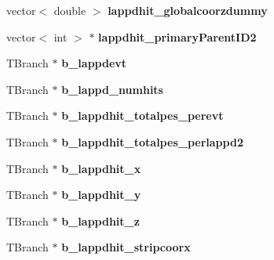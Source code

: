 \begin{DoxyCompactItemize}
\item 
\hypertarget{classLAPPDTree_a9ed8c2c3aa42ecc9fbaa575caa076940}{vector$<$ double $>$ {\bfseries lappdhit\-\_\-globalcoorzdummy}}\label{classLAPPDTree_a9ed8c2c3aa42ecc9fbaa575caa076940}

\item 
\hypertarget{classLAPPDTree_a372097f371b2bbd414b6447da2e5fd51}{vector$<$ int $>$ $\ast$ {\bfseries lappdhit\-\_\-primary\-Parent\-I\-D2}}\label{classLAPPDTree_a372097f371b2bbd414b6447da2e5fd51}

\item 
\hypertarget{classLAPPDTree_af47a619c8a87743efecb91b7fbf2c7be}{T\-Branch $\ast$ {\bfseries b\-\_\-lappdevt}}\label{classLAPPDTree_af47a619c8a87743efecb91b7fbf2c7be}

\item 
\hypertarget{classLAPPDTree_af2d3bcf8ac6d1984ddd5da708841fd81}{T\-Branch $\ast$ {\bfseries b\-\_\-lappd\-\_\-numhits}}\label{classLAPPDTree_af2d3bcf8ac6d1984ddd5da708841fd81}

\item 
\hypertarget{classLAPPDTree_aaffff4e3fa3c778499625bc2c79179de}{T\-Branch $\ast$ {\bfseries b\-\_\-lappdhit\-\_\-totalpes\-\_\-perevt}}\label{classLAPPDTree_aaffff4e3fa3c778499625bc2c79179de}

\item 
\hypertarget{classLAPPDTree_a97ffd58d9a74db4d2026aea619e55c3e}{T\-Branch $\ast$ {\bfseries b\-\_\-lappdhit\-\_\-totalpes\-\_\-perlappd2}}\label{classLAPPDTree_a97ffd58d9a74db4d2026aea619e55c3e}

\item 
\hypertarget{classLAPPDTree_aaa3ff0b6eefee590df4209064eb2907f}{T\-Branch $\ast$ {\bfseries b\-\_\-lappdhit\-\_\-x}}\label{classLAPPDTree_aaa3ff0b6eefee590df4209064eb2907f}

\item 
\hypertarget{classLAPPDTree_adc45ffd7b8f116526d1683182a8b0104}{T\-Branch $\ast$ {\bfseries b\-\_\-lappdhit\-\_\-y}}\label{classLAPPDTree_adc45ffd7b8f116526d1683182a8b0104}

\item 
\hypertarget{classLAPPDTree_ac15eb6f5a771b3a8a4af9f98ef64642c}{T\-Branch $\ast$ {\bfseries b\-\_\-lappdhit\-\_\-z}}\label{classLAPPDTree_ac15eb6f5a771b3a8a4af9f98ef64642c}

\item 
\hypertarget{classLAPPDTree_a321a08fed926fdb6e506cf99e3036932}{T\-Branch $\ast$ {\bfseries b\-\_\-lappdhit\-\_\-stripcoorx}}\label{classLAPPDTree_a321a08fed926fdb6e506cf99e3036932}


\end{DoxyCompactItemize}
